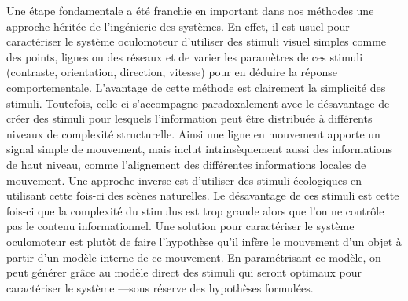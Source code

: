 \documentclass[11pt,french,a4paper,oneside]{article}%
\begin{document}
Une étape fondamentale a été franchie en important dans nos méthodes une approche héritée de l'ingénierie des systèmes. En effet, il est usuel pour caractériser le système oculomoteur d'utiliser des stimuli visuel simples comme des points, lignes ou des réseaux et de varier les paramètres de ces stimuli (contraste, orientation, direction, vitesse) pour en déduire la réponse comportementale. L'avantage de cette méthode est clairement la simplicité des stimuli. Toutefois, celle-ci s'accompagne paradoxalement avec le désavantage de créer des stimuli pour lesquels l'information peut être distribuée à différents niveaux de complexité structurelle. Ainsi une ligne en mouvement apporte un signal simple de mouvement, mais inclut intrinsèquement aussi des informations de haut niveau, comme l'alignement des différentes informations locales de mouvement. Une approche inverse est d'utiliser des stimuli écologiques en utilisant cette fois-ci des scènes naturelles. Le désavantage de ces stimuli est cette fois-ci que la complexité du stimulus est trop grande alors que l'on ne contrôle pas le contenu informationnel. Une solution pour caractériser le système oculomoteur est plutôt de faire l'hypothèse qu'il infère le mouvement d'un objet à partir d'un modèle interne de ce mouvement. En paramétrisant ce modèle, on peut générer grâce au modèle direct des stimuli qui seront optimaux pour caractériser le système ---sous réserve des hypothèses formulées. %
\end{document}
